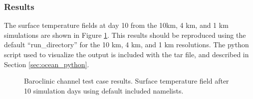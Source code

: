 \subsubsection{Results}
\label{subsubsecc:baroclinic_channel_results}
The surface temperature fields at day 10 from the 10km, 4 km, and 1 km simulations are shown in Figure \ref{fig:baroclinicChannelTemperature}.
This results should be reproduced using the default ``run\_directory'' for the 10 km, 4 km, and 1 km resolutions. The python script used to visualize the output is included with the tar file, and described in Section \ref{sec:ocean_python}.

\begin{figure}[H]
	\centering
	\caption{Baroclinic channel test case results. Surface temperature field after 10 simulation days using default included namelists.}
	\label{fig:baroclinicChannelTemperature}
	\hfill

\end{figure}
